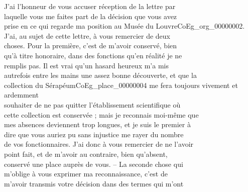 \documentclass{book}
\begin{document}
\indent J’ai l’honneur de vous accuser réception de la lettre par\\
laquelle vous me faites part de la décision que vous avez\\
prise en ce qui regarde ma position au Musée du Louvre\gls{CoEg_org_00000002}.\\
\indent J’ai, au sujet de cette lettre, à vous remercier de deux\\
choses. Pour la première, c’est de m’avoir conservé, bien\\
qu’à titre honoraire, dans des fonctions qu’en réalité je ne\\
remplis pas. Il est vrai qu’un hasard heureux m’a mis\\
autrefois entre les mains une assez bonne découverte, et que la\\
collection du Sérapéum\gls{CoEg_place_00000004} me fera toujours vivement et ardemment\\
souhaiter de ne pas quitter l’établissement scientifique où\\
cette collection est conservée ; mais je reconnais moi-même que\\
mes absences deviennent trop longues, et je suis le premier à\\
dire que vous auriez pu sans injustice me rayer du nombre\\
de vos fonctionnaires. J’ai donc à vous remercier de ne l’avoir\\
point fait, et de m’avoir au contraire, bien qu’absent,\\
conservé une place auprès de vous. – La seconde chose qui\\
m’oblige à vous exprimer ma reconnaissance, c’est de\\
m’avoir transmis votre décision dans des termes qui m’ont\\
\end{document}
